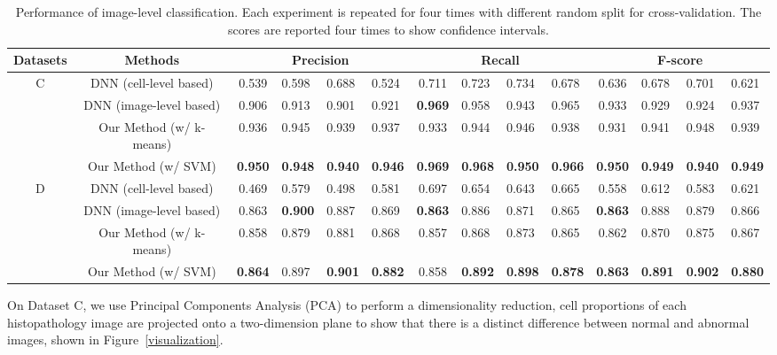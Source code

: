 \documentclass[journal]{IEEEtran}
\begin{document}
\begin{table*}[tbh!]
\centering
\caption{{\textnormal{Performance of image-level classification. Each experiment is repeated for four times with different random split for cross-validation. The scores are reported four times to show confidence intervals.}}}
\label{imagelevel}
\begin{tabular}{|c|c|c|l|l|l|c|l|l|l|c|l|l|l|}
\hline
Datasets           & Methods                   & \multicolumn{4}{c|}{Precision}         & \multicolumn{4}{c|}{Recall}            & \multicolumn{4}{c|}{F-score}           \\ \hline
\multirow{4}{*}{C} & {DNN (cell-level based)} &{0.539}&{0.598}&{0.688}&{0.524}      
                                       &{0.711}& {0.723}&{0.734}&{0.678}
                                       &{0.636}&{0.678}&{0.701}&{0.621}       \\
                   & DNN (image-level based)&0.906 & {0.913} & {0.901} &{0.921} 
                                      & \textbf{0.969} &{0.958} &{0.943} &{0.965} 
                                      & 0.933 & {0.929} & {0.924} & {0.937} \\
                   & Our Method (w/ k-means) & 0.936          & {0.945}  & {0.939} &{0.937} &0.933          &{0.944} &{0.946} &{0.938} &0.931          &{0.941}   &{0.948}  & {0.939} \\
                   & Our Method (w/ SVM)     & \textbf{0.950} & {\textbf{0.948}} &{\textbf{0.940}} & {\textbf{0.946}} &\textbf{0.969} &{\textbf{0.968}} & {\textbf{0.950}} &{\textbf{0.966}} & \textbf{0.950} &{\textbf{0.949}}  &{\textbf{0.940}}  &{\textbf{0.949}}    \\ \hline
\multirow{4}{*}{{D}} & {DNN (cell-level based)}  &{0.469}&{0.579}&{0.498}&{0.581}                                             &{0.697}&{0.654}&{0.643}&{0.665}                                             &{0.558}&{0.612}&{0.583}&{0.621}       \\
                   & {DNN (image-level based)}         &{0.863}&{\textbf{0.900}}&{0.887}&{0.869}   &{\textbf{0.863}}&{0.886}&{0.871}&{0.865}   &{\textbf{0.863}}&{0.888}&{0.879}&{0.866}  \\
                   & {Our Method (w/ k-means)} &{0.858}           &{0.879}  &{0.881}  &{0.868}   &{0.857}           &{0.868}  &{0.873}  &{0.865}   &{0.862}           &{0.870}  &{0.875}  &{0.867}  \\
                   & {Our Method (w/ SVM)}     &{\textbf{0.864}}           &{0.897}  &{\textbf{0.901}}  &{\textbf{0.882}}   &{0.858}           &{\textbf{0.892}}  &{\textbf{0.898}}  &{\textbf{0.878}}   &{\textbf{0.863}}           &{\textbf{0.891}}  &{\textbf{0.902}}  &{\textbf{0.880}}  \\ \hline
\end{tabular}
\end{table*}
On Dataset C, we use Principal Components Analysis (PCA) to perform a dimensionality reduction, cell proportions of each histopathology image are projected onto a two-dimension plane to show that there is a distinct difference between normal and abnormal images, shown in Figure~\ref{visualization}.
\end{document}
